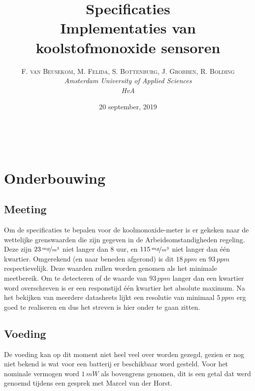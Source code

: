 \documentclass[a4paper, 11pt]{article} %
\title{\textbf{Specificaties}\\ %
Implementaties van koolstofmonoxide sensoren} %
\author{\textsc{F. van Beusekom, M. Felida, S. Bottenburg, J. Grobben, R. Bolding} %
\\{\textit{Amsterdam University of Applied Sciences\\ 
HvA}}} %
\date{20 september, 2019} %
\makeatletter
\renewcommand{\maketitle}{ %
\begin{flushright} %
{\LARGE\@title} %

\vspace{50pt} %

{\large\@author} %
\\\@date %

\vspace{40pt} %
\end{flushright}
}
\makeatother
\begin{document}
\captionsetup{justification=centering}
\hypersetup{hidelinks=true}
\maketitle %




\vspace{10pt} %

\newpage
\section{Onderbouwing}
\subsection{Meeting}
Om de specificaties te bepalen voor de koolmonoxide-meter is er gekeken naar de wettelijke grenswaarden die zijn gegeven in de Arbeidsomstandigheden regeling. Deze zijn $23\,\nicefrac{mg}{m^{3}}$ niet langer dan 8 uur, en $115\,\nicefrac{mg}{m^{3}}$ niet langer dan één kwartier. Omgerekend (en naar beneden afgerond) is dit $18\,ppm$ en $93\,ppm$ respectievelijk. Deze waarden zullen worden genomen als het minimale meetbereik. Om te detecteren of de waarde van $93\,ppm$ langer dan een kwartier word overschreven is er een responstijd één kwartier het absolute maximum. Na het bekijken van meerdere datasheets lijkt een resolutie van minimaal $5\,ppm$ erg goed te realiseren en dus het streven is hier onder te gaan zitten.
\subsection{Voeding}
De voeding kan op dit moment niet heel veel over worden gezegd, gezien er nog niet bekend is wat voor een batterij er beschikbaar word gesteld. Voor het nominale vermogen word $1\,mW$ als bovengrens genomen, dit is een getal dat werd genoemd tijdens een gesprek met Marcel van der Horst.
\end{document}
